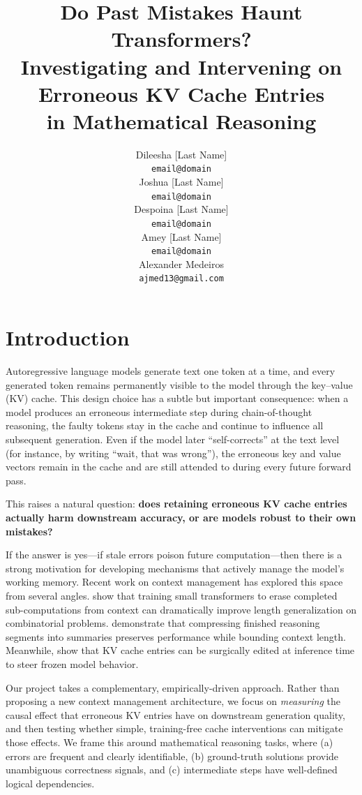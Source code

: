\documentclass[11pt,a4paper]{article}
\title{Do Past Mistakes Haunt Transformers? \\
  Investigating and Intervening on Erroneous KV Cache Entries \\
  in Mathematical Reasoning}
\author{Dileesha [Last Name] \\
  {\tt email@domain} \\\And
  Joshua [Last Name] \\
  {\tt email@domain} \\\And
  Despoina [Last Name] \\
  {\tt email@domain} \\\And
  Amey [Last Name] \\
  {\tt email@domain} \\\And
  Alexander Medeiros \\
  {\tt ajmed13@gmail.com} \\}
\date{}
\begin{document}
\maketitle

\section{Introduction}

Autoregressive language models generate text one token at a time, and every generated token remains permanently visible to the model through the key--value (KV) cache.
This design choice has a subtle but important consequence: when a model produces an erroneous intermediate step during chain-of-thought reasoning, the faulty tokens stay in the cache and continue to influence all subsequent generation.
Even if the model later ``self-corrects'' at the text level (for instance, by writing ``wait, that was wrong''), the erroneous key and value vectors remain in the cache and are still attended to during every future forward pass.

This raises a natural question: \textbf{does retaining erroneous KV cache entries actually harm downstream accuracy, or are models robust to their own mistakes?}

If the answer is yes---if stale errors poison future computation---then there is a strong motivation for developing mechanisms that actively manage the model's working memory.
Recent work on context management has explored this space from several angles.
 show that training small transformers to erase completed sub-computations from context can dramatically improve length generalization on combinatorial problems.
 demonstrate that compressing finished reasoning segments into summaries preserves performance while bounding context length.
Meanwhile,  show that KV cache entries can be surgically edited at inference time to steer frozen model behavior.

Our project takes a complementary, empirically-driven approach.
Rather than proposing a new context management architecture, we focus on \emph{measuring} the causal effect that erroneous KV entries have on downstream generation quality, and then testing whether simple, training-free cache interventions can mitigate those effects.
We frame this around mathematical reasoning tasks, where (a) errors are frequent and clearly identifiable, (b) ground-truth solutions provide unambiguous correctness signals, and (c) intermediate steps have well-defined logical dependencies.
\end{document}
